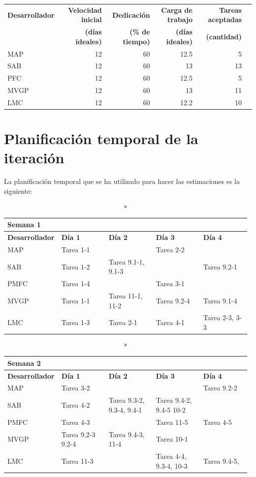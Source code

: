 \documentclass[11pt]{article}
\begin{document}
\begin{table}[H]
  \centering

  \begin{adjustbox}{width=\textwidth}
\begin{tabular}{lrrrrr}
  \toprule
  \textbf{Desarrollador} & \textbf{Velocidad inicial} & \textbf{Dedicación} & \textbf{Carga de trabajo} & \textbf{Tareas aceptadas} \\
  & \textbf{(días ideales)} & \textbf{(\% de tiempo)} & \textbf{(días ideales)} & \textbf{ (cantidad)}\\
  \midrule
  MAP & 12 & 60 & 12.5 & 5\\
  SAB & 12 & 60 & 13 & 13\\
  PFC & 12 & 60 & 12.5 & 5\\
  MVGP & 12 & 60 & 13 & 11\\
  LMC & 12 & 60 & 12.2 & 10\\
  \bottomrule
\end{tabular}
\end{adjustbox}
\end{table}

\section{Planificación temporal de la iteración}
La planificación temporal que se ha utilizado para hacer las estimaciones es la siguiente:

\begin{longtable}{p{0.18\linewidth}p{0.2\linewidth}p{0.2\linewidth}p{0.2\linewidth}p{0.2\linewidth}}
  \caption*{Semana 1}\\
  \toprule
  \textbf{Desarrollador} & \textbf{Día 1} & \textbf{Día 2} & \textbf{Día 3} & \textbf{Día 4} \\
  \midrule
  MAP  &Tarea 1-1 & & Tarea 2-2 &  \\
  SAB &   Tarea 1-2  & Tarea 9.1-1, 9.1-3 &  & Tarea 9.2-1\\
  PMFC &Tarea 1-4 & &Tarea 3-1 \\
  MVGP & Tarea 1-1 &Tarea 11-1, 11-2 &Tarea 9.2-4 & Tarea 9.1-4 \\
  LMC & Tarea 1-3 & Tarea 2-1 & Tarea 4-1& Tarea 2-3, 3-3 \\
  \bottomrule
\end{longtable}


\begin{longtable}{p{0.18\linewidth}p{0.2\linewidth}p{0.2\linewidth}p{0.2\linewidth}p{0.2\linewidth}}
  \caption*{Semana 2}\\
  \toprule
  \textbf{Desarrollador} & \textbf{Día 1} & \textbf{Día 2} & \textbf{Día 3} & \textbf{Día 4} \\
  \midrule
  MAP &Tarea 3-2  && & Tarea 9.2-2 \\
  SAB & Tarea 4-2  & Tarea 9.3-2, 9.3-4, 9.4-1 & Tarea 9.4-2, 9.4-5 10-2 \\
  PMFC & Tarea 4-3 &  &Tarea 11-5 & Tarea 4-5 \\
  MVGP &Tarea 9.2-3 9.2-4& Tarea 9.4-3, 11-4&Tarea 10-1 & \\
  LMC  &Tarea 11-3&& Tarea 4-4, 9.3-4, 10-3& Tarea 9.4-5, \\
  \bottomrule
\end{longtable}
\end{document}
